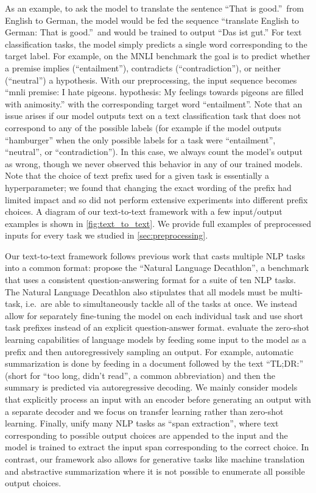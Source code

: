 \documentclass[twoside,11pt]{article}
\begin{document}
As an example, to ask the model to translate the sentence ``That is good.''\ from English to German, the model would be fed the sequence ``translate English to German: That is good.''\ and would be trained to output ``Das ist gut.''
For text classification tasks, the model simply predicts a single word corresponding to the target label.
For example, on the MNLI benchmark \citep{williams2017broad} the goal is to predict whether a premise implies (``entailment''), contradicts (``contradiction''), or neither (``neutral'') a hypothesis.
With our preprocessing, the input sequence becomes ``mnli premise: I hate pigeons. hypothesis: My feelings towards pigeons are filled with animosity.'' with the corresponding target word ``entailment''.
Note that an issue arises if our model outputs text on a text classification task that does not correspond to any of the possible labels (for example if the model outputs ``hamburger'' when the only possible labels for a task were ``entailment'', ``neutral'', or ``contradiction'').
In this case, we always count the model's output as wrong, though we never observed this behavior in any of our trained models.
Note that the choice of text prefix used for a given task is essentially a hyperparameter; we found that changing the exact wording of the prefix had limited impact and so did not perform extensive experiments into different prefix choices.
A diagram of our text-to-text framework with a few input/output examples is shown in \cref{fig:text_to_text}.
We provide full examples of preprocessed inputs for every task we studied in \cref{sec:preprocessing}.

Our text-to-text framework follows previous work that casts multiple NLP tasks into a common format:
\citet{mccann2018natural} propose the ``Natural Language Decathlon'', a benchmark that uses a consistent question-answering format for a suite of ten NLP tasks.
The Natural Language Decathlon also stipulates that all models must be multi-task, i.e.\ are able to simultaneously tackle all of the tasks at once.
We instead allow for separately fine-tuning the model on each individual task and use short task prefixes instead of an explicit question-answer format.
\citet{radford2019language} evaluate the zero-shot learning capabilities of language models by feeding some input to the model as a prefix and then autoregressively sampling an output.
For example, automatic summarization is done by feeding in a document followed by the text ``TL;DR:'' (short for ``too long, didn't read'', a common abbreviation) and then the summary is predicted via autoregressive decoding.
We mainly consider models that explicitly process an input with an encoder before generating an output with a separate decoder and we focus on transfer learning rather than zero-shot learning.
Finally, \citet{keskar2019unifying} unify many NLP tasks as ``span extraction'', where text corresponding to possible output choices are appended to the input and the model is trained to extract the input span corresponding to the correct choice.
In contrast, our framework also allows for generative tasks like machine translation and abstractive summarization where it is not possible to enumerate all possible output choices.
\end{document}
